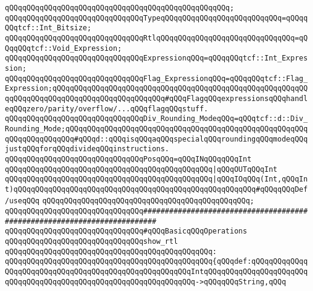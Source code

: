 \verb|qQQqqQQqqQQqqQQqqQQqqQQqqQQqqQQqqQQqqQQqqQQqqQQqqQQq;|\newline
\newline
\verb|qQQqqQQqqQQqqQQqqQQqqQQqqQQqqQQqTypeqQQqqQQqqQQqqQQqqQQqqQQqqQQq=qQQqqQQqtcf::Int_Bitsize;|\newline
\verb|qQQqqQQqqQQqqQQqqQQqqQQqqQQqqQQqRtlqQQqqQQqqQQqqQQqqQQqqQQqqQQqqQQq=qQQqqQQqtcf::Void_Expression;|\newline
\verb|qQQqqQQqqQQqqQQqqQQqqQQqqQQqqQQqExpressionqQQq=qQQqqQQqtcf::Int_Expression;|\newline
\newline
\verb|qQQqqQQqqQQqqQQqqQQqqQQqqQQqqQQqFlag_ExpressionqQQq=qQQqqQQqtcf::Flag_Expression;qQQqqQQqqQQqqQQqqQQqqQQqqQQqqQQqqQQqqQQqqQQqqQQqqQQqqQQqqQQqqQQqqQQqqQQqqQQqqQQqqQQqqQQqqQQqqQQq#qQQqFlagqQQqexpressionsqQQqhandleqQQqzero/parity/overflow/...qQQqflagqQQqstuff.|\newline
\newline
\verb|qQQqqQQqqQQqqQQqqQQqqQQqqQQqqQQqDiv_Rounding_ModeqQQq=qQQqtcf::d::Div_Rounding_Mode;qQQqqQQqqQQqqQQqqQQqqQQqqQQqqQQqqQQqqQQqqQQqqQQqqQQqqQQqqQQqqQQqqQQqqQQq#qQQqd::qQQqisqQQqaqQQqspecialqQQqroundingqQQqmodeqQQqjustqQQqforqQQqdivideqQQqinstructions.|\newline
\newline
\verb|qQQqqQQqqQQqqQQqqQQqqQQqqQQqqQQqPosqQQq=qQQqINqQQqqQQqInt|\newline
\verb|qQQqqQQqqQQqqQQqqQQqqQQqqQQqqQQqqQQqqQQqqQQqqQQq|\verb#|qQQqOUTqQQqInt#\newline
\verb|qQQqqQQqqQQqqQQqqQQqqQQqqQQqqQQqqQQqqQQqqQQqqQQq|\verb#|qQQqIOqQQq(Int,qQQqInt)qQQqqQQqqQQqqQQqqQQqqQQqqQQqqQQqqQQqqQQqqQQqqQQqqQQqqQQq#\verb|#qQQqqQQqDef/useqQQq|\newline
\verb|qQQqqQQqqQQqqQQqqQQqqQQqqQQqqQQqqQQqqQQqqQQqqQQq;|\newline
\newline
\newline
\verb|qQQqqQQqqQQqqQQqqQQqqQQqqQQqqQQq#########################################################################|\newline
\verb|qQQqqQQqqQQqqQQqqQQqqQQqqQQqqQQq#qQQqBasicqQQqOperations|\newline
\newline
\verb|qQQqqQQqqQQqqQQqqQQqqQQqqQQqqQQqshow_rtl|\newline
\verb|qQQqqQQqqQQqqQQqqQQqqQQqqQQqqQQqqQQqqQQqqQQqqQQq:|\newline
\verb|qQQqqQQqqQQqqQQqqQQqqQQqqQQqqQQqqQQqqQQqqQQqqQQq{qQQqdef:qQQqqQQqqQQqqQQqqQQqqQQqqQQqqQQqqQQqqQQqqQQqqQQqqQQqqQQqIntqQQqqQQqqQQqqQQqqQQqqQQqqQQqqQQqqQQqqQQqqQQqqQQqqQQqqQQqqQQqqQQqqQQq->qQQqqQQqString,qQQq|\newline
